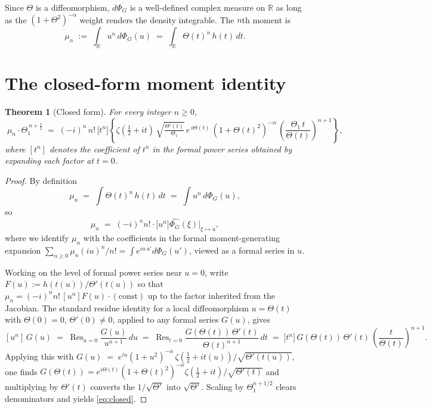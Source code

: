 \documentclass[11pt]{amsart}
\newtheorem{theorem}{Theorem}
\theoremstyle{definition}
\DeclareMathOperator{\Res}{Res}
\begin{document}
Since $\Theta$ is a diffeomorphism, $d\Phi_G$ is a well-defined complex
measure on $\mathbb{R}$ as long as the $(1+\Theta^2)^{-\alpha}$ weight renders
the density integrable.  The $n$th moment is
\[
   \mu_n\;:=\;\int_{\mathbb{R}}u^n\,d\Phi_G(u)
   \;=\;\int_{\mathbb{R}}\Theta(t)^n\,h(t)\,dt.
\]

\section{The closed-form moment identity}

\begin{theorem}[Closed form]\label{thm:closed}
For every integer $n\ge 0$,
\begin{equation}\label{eq:closed}
\boxed{\;\mu_{n}\cdot\Theta_{1}^{\,n+\tfrac12}
   \;=\; (-i)^{n}\,n!\,
   \bigl[t^{n}\bigr]\!\left\{
     \zeta(\tfrac12+it)\,
     \sqrt{\tfrac{\Theta'(t)}{\Theta_{1}}}\,
     e^{\,i\Theta(t)}\,
     (1+\Theta(t)^{2})^{-\alpha}\,
     \!\left(\frac{\Theta_{1}\,t}{\Theta(t)}\right)^{\!n+1}\right\},\;}
\end{equation}
where $[t^{n}]$ denotes the coefficient of $t^{n}$ in the formal power series
obtained by expanding each factor at $t=0$.
\end{theorem}

\begin{proof}
By definition
\[
   \mu_n \;=\; \int \Theta(t)^n\,h(t)\,dt
          \;=\; \int u^n\,d\Phi_G(u),
\]
so
\[
   \mu_n\;=\;(-i)^n n!\cdot\bigl[u^n\bigr]\widehat{\Phi_{G}}(\xi)\bigg|_{\xi\mapsto u},
\]
where we identify $\mu_n$ with the coefficients in the formal
moment-generating expansion
$\sum_{n\ge 0}\mu_n(iu)^n/n! = \int e^{iu\,u'}d\Phi_G(u')$,
viewed as a formal series in $u$.

Working on the level of formal power series near $u=0$, write
$F(u):=h(t(u))/\Theta'(t(u))$ so that $\mu_n = (-i)^n n!\,[u^n]F(u)\cdot(\text{const})$
up to the factor inherited from the Jacobian.  The standard residue identity
for a local diffeomorphism $u=\Theta(t)$ with $\Theta(0)=0$, $\Theta'(0)\ne 0$,
applied to any formal series $G(u)$, gives
\[
   [u^n]\,G(u)
   \;=\;\Res_{u=0}\frac{G(u)}{u^{n+1}}\,du
   \;=\;\Res_{t=0}\frac{G(\Theta(t))\,\Theta'(t)}{\Theta(t)^{n+1}}\,dt
   \;=\;\bigl[t^{n}\bigr]\,G(\Theta(t))\,\Theta'(t)\,
         \!\left(\frac{t}{\Theta(t)}\right)^{\!n+1}.
\]
Applying this with
\(
G(u) \;=\; e^{iu}(1+u^2)^{-\alpha}\,\zeta(\tfrac12+it(u))/\sqrt{\Theta'(t(u))}
\),
one finds $G(\Theta(t))=e^{i\Theta(t)}(1+\Theta(t)^2)^{-\alpha}\zeta(\tfrac12+it)/\sqrt{\Theta'(t)}$
and multiplying by $\Theta'(t)$ converts the $1/\sqrt{\Theta'}$ into $\sqrt{\Theta'}$.
Scaling by $\Theta_1^{n+1/2}$ clears denominators and yields \eqref{eq:closed}.
\end{proof}
\end{document}
